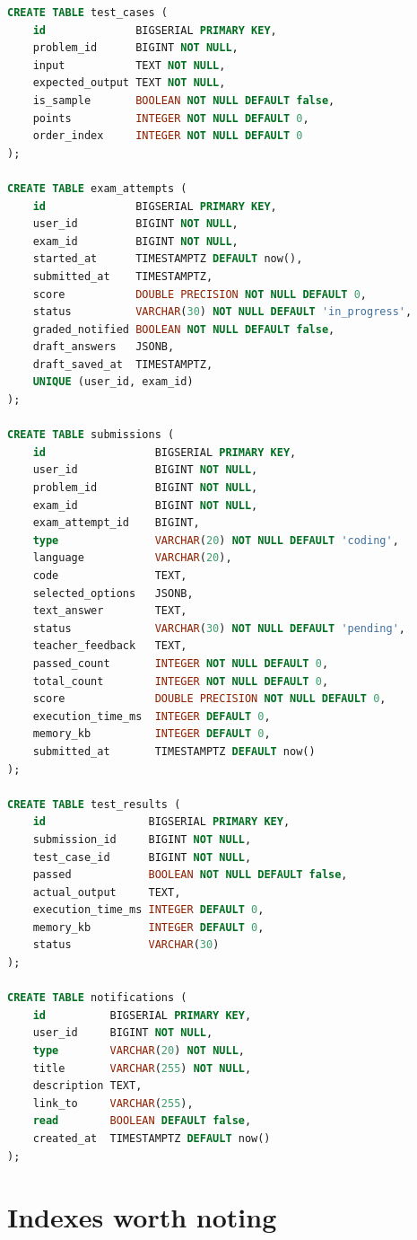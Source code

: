 \begin{lstlisting}[language=SQL,basicstyle=\ttfamily\footnotesize,breaklines=true]
CREATE TABLE test_cases (
    id              BIGSERIAL PRIMARY KEY,
    problem_id      BIGINT NOT NULL,
    input           TEXT NOT NULL,
    expected_output TEXT NOT NULL,
    is_sample       BOOLEAN NOT NULL DEFAULT false,
    points          INTEGER NOT NULL DEFAULT 0,
    order_index     INTEGER NOT NULL DEFAULT 0
);

CREATE TABLE exam_attempts (
    id              BIGSERIAL PRIMARY KEY,
    user_id         BIGINT NOT NULL,
    exam_id         BIGINT NOT NULL,
    started_at      TIMESTAMPTZ DEFAULT now(),
    submitted_at    TIMESTAMPTZ,
    score           DOUBLE PRECISION NOT NULL DEFAULT 0,
    status          VARCHAR(30) NOT NULL DEFAULT 'in_progress',
    graded_notified BOOLEAN NOT NULL DEFAULT false,
    draft_answers   JSONB,
    draft_saved_at  TIMESTAMPTZ,
    UNIQUE (user_id, exam_id)
);

CREATE TABLE submissions (
    id                 BIGSERIAL PRIMARY KEY,
    user_id            BIGINT NOT NULL,
    problem_id         BIGINT NOT NULL,
    exam_id            BIGINT NOT NULL,
    exam_attempt_id    BIGINT,
    type               VARCHAR(20) NOT NULL DEFAULT 'coding',
    language           VARCHAR(20),
    code               TEXT,
    selected_options   JSONB,
    text_answer        TEXT,
    status             VARCHAR(30) NOT NULL DEFAULT 'pending',
    teacher_feedback   TEXT,
    passed_count       INTEGER NOT NULL DEFAULT 0,
    total_count        INTEGER NOT NULL DEFAULT 0,
    score              DOUBLE PRECISION NOT NULL DEFAULT 0,
    execution_time_ms  INTEGER DEFAULT 0,
    memory_kb          INTEGER DEFAULT 0,
    submitted_at       TIMESTAMPTZ DEFAULT now()
);

CREATE TABLE test_results (
    id                BIGSERIAL PRIMARY KEY,
    submission_id     BIGINT NOT NULL,
    test_case_id      BIGINT NOT NULL,
    passed            BOOLEAN NOT NULL DEFAULT false,
    actual_output     TEXT,
    execution_time_ms INTEGER DEFAULT 0,
    memory_kb         INTEGER DEFAULT 0,
    status            VARCHAR(30)
);

CREATE TABLE notifications (
    id          BIGSERIAL PRIMARY KEY,
    user_id     BIGINT NOT NULL,
    type        VARCHAR(20) NOT NULL,
    title       VARCHAR(255) NOT NULL,
    description TEXT,
    link_to     VARCHAR(255),
    read        BOOLEAN DEFAULT false,
    created_at  TIMESTAMPTZ DEFAULT now()
);
\end{lstlisting}

\section{Indexes worth noting}

